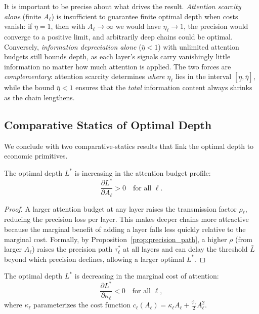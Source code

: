 It is important to be precise about what drives the result. \emph{Attention scarcity alone} (finite $A_\ell$) is insufficient to guarantee finite optimal depth when costs vanish: if $\bar{\eta} = 1$, then with $A_\ell \to \infty$ we would have $\eta_\ell \to 1$, the precision would converge to a positive limit, and arbitrarily deep chains could be optimal. Conversely, \emph{information depreciation alone} ($\bar{\eta} < 1$) with unlimited attention budgets still bounds depth, as each layer's signals carry vanishingly little information no matter how much attention is applied. The two forces are \emph{complementary}: attention scarcity determines \emph{where} $\eta_\ell$ lies in the interval $[\underline{\eta}, \bar{\eta}]$, while the bound $\bar{\eta} < 1$ ensures that the \emph{total} information content always shrinks as the chain lengthens.

\subsection{Comparative Statics of Optimal Depth}
\label{subsec:comp_statics_depth}

We conclude with two comparative-statics results that link the optimal depth to economic primitives.

\begin{proposition}\label{prop:budget_depth}
The optimal depth $L^*$ is increasing in the attention budget profile:
\begin{equation}\label{eq:budget_depth}
\frac{\partial L^*}{\partial A_\ell} > 0 \quad \text{for all } \ell.
\end{equation}
\end{proposition}

\begin{proof}
A larger attention budget at any layer raises the transmission factor $\rho_\ell$, reducing the precision loss per layer. This makes deeper chains more attractive because the marginal benefit of adding a layer falls less quickly relative to the marginal cost. Formally, by Proposition~\ref{prop:precision_path}, a higher $\rho$ (from larger $A_\ell$) raises the precision path $\tau^*_\ell$ at all layers and can delay the threshold $\bar{L}$ beyond which precision declines, allowing a larger optimal $L^*$.
\end{proof}

\begin{proposition}\label{prop:cost_depth}
The optimal depth $L^*$ is decreasing in the marginal cost of attention:
\begin{equation}\label{eq:cost_depth}
\frac{\partial L^*}{\partial \kappa_\ell} < 0 \quad \text{for all } \ell,
\end{equation}
where $\kappa_\ell$ parameterizes the cost function $c_\ell(A_\ell) = \kappa_\ell A_\ell + \frac{\phi_\ell}{2} A_\ell^2$.
\end{proposition}

